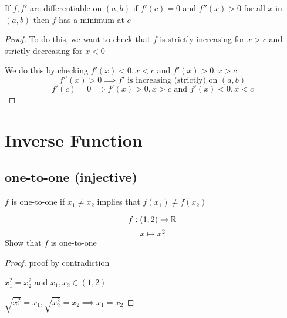 \begin{theorem*}
  If $f, f'$ are differentiable on $(a, b)$ if $f'(c) = 0$ and $f''(x) > 0$ for all $x$ in $(a, b)$ 
  then $f$ has a minimum at $c$
\end{theorem*}

\begin{proof}
To do this, we want to check that $f$ is strictly increasing for $x > c$ and strictly decreasing for $x < 0$

We do this by checking $f'(x) < 0, x < c$ and $f'(x) > 0, x > c$
$$f''(x) > 0 \implies f' \text{ is increasing (strictly) on }(a, b) $$
$$f'(c) = 0 \implies f'(x) > 0, x > c \text{ and } f'(x) < 0, x < c$$
\end{proof}



\section{Inverse Function}

\subsection{one-to-one (injective)}
$f$ is one-to-one if $x_1 \neq x_2$ implies that $f(x_1) \neq f(x_2)$

\begin{example*}
  $$f: (1, 2) \to \mathbb R$$
  $$x \mapsto x^2$$
  Show that $f$ is one-to-one
\end{example*}

\begin{proof}
  proof by contradiction

  $x_1^2 = x_2^2$ and $x_1, x_2 \in (1, 2)$

  $\sqrt{x_1^2} = x_1, \sqrt{x_2^2} = x_2 \implies x_1 = x_2$
\end{proof}

